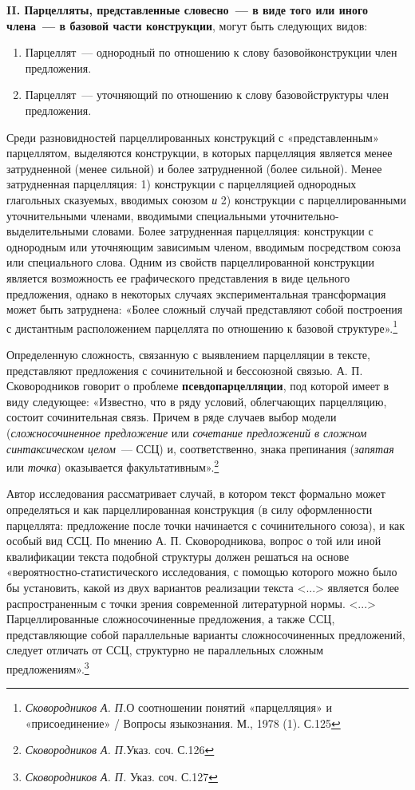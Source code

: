 \documentclass{kursa4}
\begin{document}
      \textbf{II. Парцелляты, представленные словесно~--- в виде того или иного члена~--- в базовой части конструкции}, могут быть следующих видов: \begin{enumerate}
        \item {Парцеллят~--- однородный по отношению к слову базовой}{конструкции член предложения.}
        \item {Парцеллят~--- уточняющий по отношению к слову базовой}{структуры член предложения.}
      \end{enumerate}

      Среди разновидностей парцеллированных конструкций с «представленным» парцеллятом, выделяются конструкции, в которых парцелляция является менее затрудненной (менее сильной) и более затрудненной (более сильной). Менее затрудненная парцелляция: 1) конструкции с парцелляцией однородных глагольных сказуемых, вводимых союзом \textit{и }2) конструкции с парцеллированными уточнительными членами, вводимыми специальными уточнительно-выделительными словами. Более затрудненная парцелляция: конструкции с однородным или уточняющим зависимым членом, вводимым посредством союза или специального слова. Одним из свойств парцеллированной конструкции является возможность ее графического представления в виде цельного предложения, однако в некоторых случаях экспериментальная трансформация может быть затруднена: «Более сложный случай представляют собой построения с дистантным расположением парцеллята по отношению к базовой структуре».\footnote{\textit{{ Сковородников А. П.}}{О соотношении понятий «парцелляция» и «присоединение» / Вопросы языкознания. М., 1978 (1). С.125}}

      Определенную сложность, связанную с выявлением парцелляции в тексте, представляют предложения с сочинительной и бессоюзной связью. А. П. Сковородников говорит о проблеме \textbf{псевдопарцелляции}, под которой имеет в виду следующее: «Известно, что в ряду условий, облегчающих парцелляцию, состоит сочинительная связь. Причем в ряде случаев выбор модели (\textit{сложносочиненное предложение} или \textit{сочетание предложений в сложном синтаксическом целом}{~--- ССЦ) и, соответственно, знака препинания (}\textit{запятая} или \textit{точка}) оказывается факультативным».\footnote{\textit{Сковородников А. П.}{Указ. соч. С.126}}

      Автор исследования рассматривает случай, в котором текст формально может определяться и как парцеллированная конструкция (в силу оформленности парцеллята: предложение после точки начинается с сочинительного союза), и как особый вид ССЦ. По мнению А. П. Сковородникова, вопрос о той или иной квалификации текста подобной структуры должен решаться на основе «вероятностно-статистического исследования, с помощью которого можно было бы установить, какой из двух вариантов реализации текста \textless{}...\textgreater{} является более распространенным с точки зрения современной литературной нормы. \textless{}...\textgreater{} Парцеллированные сложносочиненные предложения, а также ССЦ, представляющие собой параллельные варианты сложносочиненных предложений, следует отличать от
      {ССЦ, структурно не параллельных сложным предложениям}{».}\footnote{\textit{{ Сковородников А. П. }}{Указ. соч. С.127}}{ }
\end{document}
